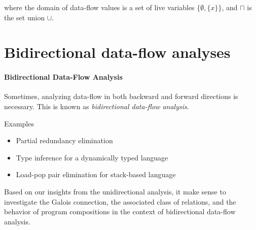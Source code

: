 \documentclass{llncs}
\newcommand{\meet}{\sqcap}
\begin{document}
  where the domain of data-flow values is a set of live variables $\{\emptyset, \{ x \}\}$, and $\meet$ is the set union $\cup$.

\section{Bidirectional data-flow analyses}  

  \paragraph{Bidirectional Data-Flow Analysis}
  Sometimes, analyzing data-flow in both backward and forward directions is necessary. This is known as \emph{bidirectional data-flow analysis}.


  Examples
  \begin{itemize}
    \item Partial redundancy elimination
    \item Type inference for a dynamically typed language
    \item Load-pop pair elimination for stack-based language
  \end{itemize}
  Based on our insights from the unidirectional analysis, it make sense to investigate the Galois connection, the associated class of relations, and the behavior of program compositions in the context of bidirectional data-flow analysis.
\end{document}
